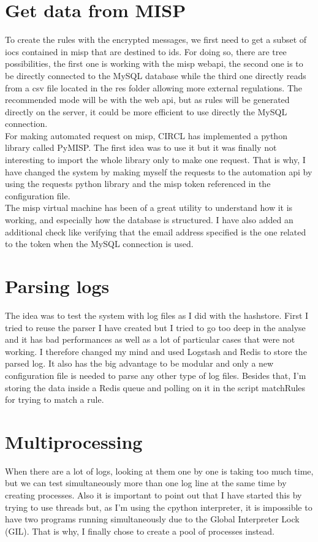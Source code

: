 \documentclass{eplmastersthesis}
\begin{document}
\section{Get data from MISP}
To create the rules with the encrypted messages, we first need to get a subset of \glspl{ioc} contained in \gls{misp} that are destined to \gls{ids}. 
For doing so, there are tree possibilities, the first one is working with the \gls{misp} web\gls{api}, the second one is to be directly connected to the MySQL database while the third one directly reads from a \gls{csv} file located in the res folder allowing more external regulations.
The recommended mode will be with the web \gls{api}, but as rules will be generated directly on the server, it could be more efficient to use directly the MySQL connection.\\

For making automated request on \gls{misp}, CIRCL has implemented a python library called PyMISP. The first idea was to use it but it was finally not interesting to import the whole library only to make one request. That is why, I have changed the system by making myself the requests to the automation \gls{api} by using the requests python library and the \gls{misp} token referenced in the configuration file.\\

The \gls{misp} virtual machine has been of a great utility to understand how it is working, and especially how the database is structured. I have also added an additional check like verifying that the email address specified is the one related to the token when the MySQL connection is used.

\section{Parsing logs}
The idea was to test the system with log files as I did with the hashstore. First I tried to reuse the parser I have created but I tried to go too deep in the analyse and it has bad performances as well as a lot of particular cases that were not working.
I therefore changed my mind and used Logstash and Redis to store the parsed log. 
It also has the big advantage to be modular and only a new configuration file is needed to parse any other type of log files.
Besides that, I'm storing the data inside a Redis queue and polling on it in the script matchRules for trying to match a rule. \\

\section{Multiprocessing}
When there are a lot of logs, looking at them one by one is taking too much time, but we can test simultaneously more than one log line at the same time by creating processes.
Also it is important to point out that I have started this by trying to use threads but, as I'm using the cpython interpreter, it is impossible to have two programs running simultaneously due to the Global Interpreter Lock (GIL). That is why, I finally chose to create a pool of processes instead.
\end{document}

